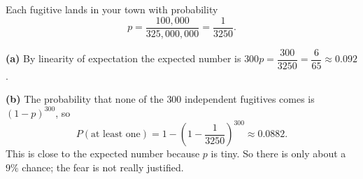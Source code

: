 Each fugitive lands in your town with probability
\[
p=\dfrac{100{,}000}{325{,}000{,}000}=\dfrac{1}{3250}.
\]

\textbf{(a)} By linearity of expectation the expected number is $300p=\dfrac{300}{3250}=\boxed{\dfrac{6}{65}\approx0.092}$.

\textbf{(b)} The probability that none of the $300$ independent fugitives comes is $(1-p)^{300}$, so
\[
P(\text{at least one})=1-\left(1-\dfrac{1}{3250}\right)^{300}\approx\boxed{0.0882}.
\]
This is close to the expected number because $p$ is tiny. So there is only about a $9\%$ chance; the fear is not really justified.
